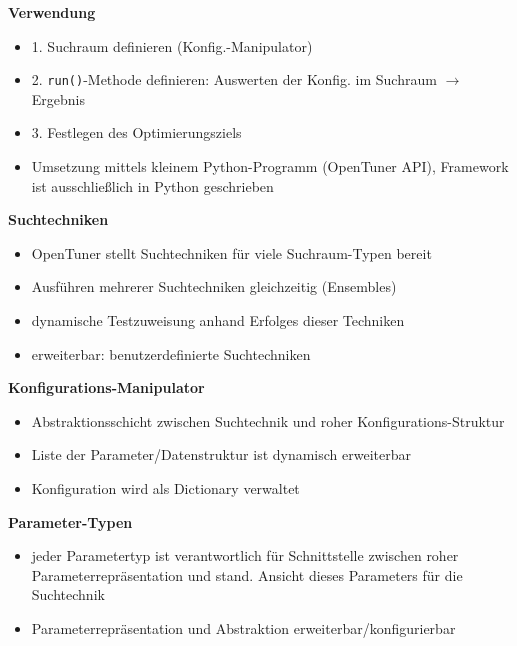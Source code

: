 
  \begin{frame}
  \textbf{Verwendung}
  \begin{itemize}
    \item 1. Suchraum definieren (Konfig.-Manipulator)
    \item 2. \texttt{run()}-Methode definieren: Auswerten der Konfig. im Suchraum $\rightarrow$ Ergebnis
    \item 3. Festlegen des Optimierungsziels
    \item Umsetzung mittels kleinem Python-Programm (OpenTuner API), Framework ist ausschließlich in 
    Python geschrieben
  \end{itemize}
  \textbf{Suchtechniken}
  \begin{itemize}
    \item OpenTuner stellt Suchtechniken für viele Suchraum-Typen bereit
    \item Ausführen mehrerer Suchtechniken gleichzeitig (Ensembles)
    \item dynamische Testzuweisung anhand Erfolges dieser Techniken
    \item erweiterbar: benutzerdefinierte Suchtechniken
  \end{itemize}
  \end{frame}
  


  \begin{frame}
  \textbf{Konfigurations-Manipulator}
  \begin{itemize}
    \item Abstraktionsschicht zwischen Suchtechnik und roher Konfigurations-Struktur
    \item Liste der Parameter/Datenstruktur ist dynamisch erweiterbar
    \item Konfiguration wird als Dictionary verwaltet \newline
  \end{itemize}
  \textbf{Parameter-Typen}
  \begin{itemize}
    \item jeder Parametertyp ist verantwortlich für Schnittstelle zwischen roher 
    Parameterrepräsentation und stand. Ansicht dieses Parameters für die Suchtechnik
    \item Parameterrepräsentation und Abstraktion erweiterbar/konfigurierbar
  \end{itemize}
  \end{frame}
  
